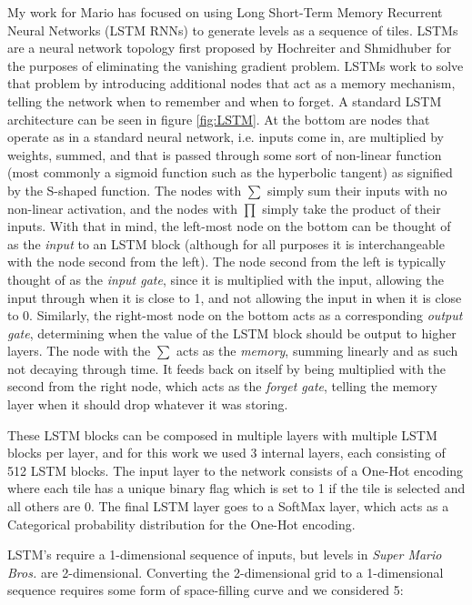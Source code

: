 \documentclass[a4paper]{article}
\begin{document}
My work for Mario has focused on using Long Short-Term Memory Recurrent Neural Networks (LSTM RNNs) to generate levels as a sequence of tiles.
LSTMs are a neural network topology first proposed by Hochreiter  and Shmidhuber \cite{LSTM} for the purposes of eliminating the vanishing gradient problem.  LSTMs work to solve that problem by introducing additional nodes that act as a memory mechanism, telling the network when to remember and when to forget.  A standard LSTM architecture can be seen in figure \ref{fig:LSTM}.  At the bottom
are nodes that operate as in a standard neural network, i.e. inputs come in, are multiplied by weights, summed, and that is passed through some sort of non-linear function (most commonly a sigmoid function such as the hyperbolic tangent) as signified by the S-shaped function.  The nodes with $\sum$ simply sum their inputs with no non-linear activation, and the nodes with $\prod$ simply take the product of their inputs.  With that in mind, the left-most node on the bottom can be thought of as the \textit{input} to an LSTM block (although for all purposes it is interchangeable with the node second from the left).  The node second from the left is typically thought of as the \textit{input gate}, since it is multiplied with the input, allowing the input through when it is close to 1, and not allowing the input in when it is close to 0.  Similarly, the right-most node on the bottom acts as a corresponding \textit{output gate}, determining when the value of the LSTM block should be output to higher layers.  The node with the $\sum$ acts as the \textit{memory}, summing linearly and as such not decaying through time.  It feeds back on itself by being multiplied with the second from the right node, which acts as the \textit{forget gate}, telling the memory layer when it should drop whatever it was storing. 

These LSTM blocks can be composed in multiple layers with multiple LSTM blocks per layer, and for this work we used 3 internal layers, each consisting of 512 LSTM blocks.  The input layer to the network consists of a One-Hot encoding where each tile has a unique binary flag which is set to 1 if the tile is selected and all others are 0.  The final LSTM layer goes to a SoftMax layer, which acts as a Categorical probability distribution for the One-Hot encoding.  

LSTM's require a 1-dimensional sequence of inputs, but levels in \textit{Super Mario Bros.} are 2-dimensional.  Converting the 2-dimensional grid to a 1-dimensional sequence requires some form of space-filling curve and we considered 5: 
\end{document}

